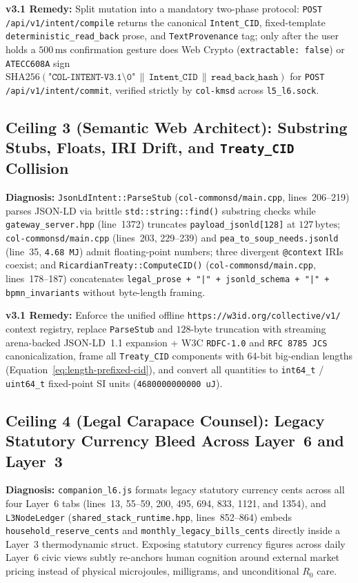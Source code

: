 \textbf{v3.1 Remedy:} Split mutation into a mandatory two-phase protocol: \texttt{POST /api/v1/intent/compile} returns the canonical \texttt{Intent\_CID}, fixed-template \texttt{deterministic\_read\_back} prose, and \texttt{TextProvenance} tag; only after the user holds a $500\,\mathrm{ms}$ confirmation gesture does Web Crypto (\texttt{extractable: false}) or \texttt{ATECC608A} sign $\mathrm{SHA256}(\texttt{"COL-INTENT-V3.1\textbackslash0"} \,\|\, \texttt{Intent\_CID} \,\|\, \texttt{read\_back\_hash})$ for \texttt{POST /api/v1/intent/commit}, verified strictly by \texttt{col-kmsd} across \texttt{l5\_l6.sock}.

\subsection{Ceiling 3 (Semantic Web Architect): Substring Stubs, Floats, IRI Drift, and \texttt{Treaty\_CID} Collision}
\textbf{Diagnosis:} \texttt{JsonLdIntent::ParseStub} (\texttt{col-commonsd/main.cpp}, lines~206--219) parses JSON-LD via brittle \texttt{std::string::find()} substring checks while \texttt{gateway\_server.hpp} (line~1372) truncates \texttt{payload\_jsonld[128]} at $127\,\mathrm{bytes}$; \texttt{col-commonsd/main.cpp} (lines~203, 229--239) and \texttt{pea\_to\_soup\_needs.jsonld} (line~35, \texttt{4.68 MJ}) admit floating-point numbers; three divergent \texttt{@context} IRIs coexist; and \texttt{RicardianTreaty::ComputeCID()} (\texttt{col-commonsd/main.cpp}, lines~178--187) concatenates \texttt{legal\_prose + "|" + jsonld\_schema + "|" + bpmn\_invariants} without byte-length framing.

\textbf{v3.1 Remedy:} Enforce the unified offline \texttt{https://w3id.org/collective/v1/} context registry, replace \texttt{ParseStub} and $128$-byte truncation with streaming arena-backed JSON-LD~1.1 expansion + W3C \texttt{RDFC-1.0} and \texttt{RFC 8785 JCS} canonicalization, frame all \texttt{Treaty\_CID} components with 64-bit big-endian lengths (Equation~\ref{eq:length-prefixed-cid}), and convert all quantities to \texttt{int64\_t} / \texttt{uint64\_t} fixed-point SI units (\texttt{4680000000000 uJ}).

\subsection{Ceiling 4 (Legal Carapace Counsel): Legacy Statutory Currency Bleed Across Layer~6 and Layer~3}
\textbf{Diagnosis:} \texttt{companion\_l6.js} formats legacy statutory currency cents across all four Layer~6 tabs (lines~13, 55--59, 200, 495, 694, 833, 1121, and 1354), and \texttt{L3NodeLedger} (\texttt{shared\_stack\_runtime.hpp}, lines~852--864) embeds \texttt{household\_reserve\_cents} and \texttt{monthly\_legacy\_bills\_cents} directly inside a Layer~3 thermodynamic struct. Exposing statutory currency figures across daily Layer~6 civic views subtly re-anchors human cognition around external market pricing instead of physical microjoules, milligrams, and unconditional $R_0$ care.

